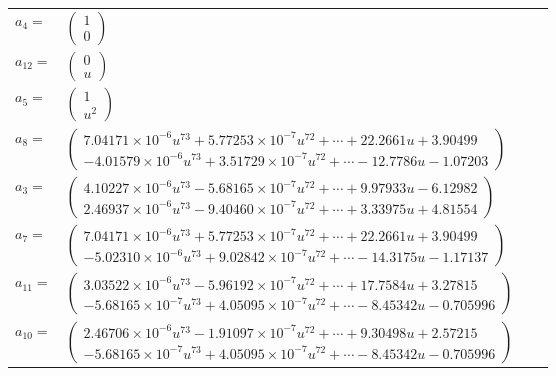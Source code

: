 \documentclass[1p]{elsarticle_modified}
\theoremstyle{definition}
\begin{document}
\begin{tabular}{m{7pt} m{180pt} m{7pt} m{180pt} }
\flushright $a_{4}=$&$\begin{pmatrix}1\\0\end{pmatrix}$ \\
\flushright $a_{12}=$&$\begin{pmatrix}0\\u\end{pmatrix}$ \\
\flushright $a_{5}=$&$\begin{pmatrix}1\\u^2\end{pmatrix}$ \\
\flushright $a_{8}=$&$\begin{pmatrix}7.04171\times10^{-6} u^{73}+5.77253\times10^{-7} u^{72}+\cdots+22.2661 u+3.90499\\-4.01579\times10^{-6} u^{73}+3.51729\times10^{-7} u^{72}+\cdots-12.7786 u-1.07203\end{pmatrix}$ \\
\flushright $a_{3}=$&$\begin{pmatrix}4.10227\times10^{-6} u^{73}-5.68165\times10^{-7} u^{72}+\cdots+9.97933 u-6.12982\\2.46937\times10^{-6} u^{73}-9.40460\times10^{-7} u^{72}+\cdots+3.33975 u+4.81554\end{pmatrix}$ \\
\flushright $a_{7}=$&$\begin{pmatrix}7.04171\times10^{-6} u^{73}+5.77253\times10^{-7} u^{72}+\cdots+22.2661 u+3.90499\\-5.02310\times10^{-6} u^{73}+9.02842\times10^{-7} u^{72}+\cdots-14.3175 u-1.17137\end{pmatrix}$ \\
\flushright $a_{11}=$&$\begin{pmatrix}3.03522\times10^{-6} u^{73}-5.96192\times10^{-7} u^{72}+\cdots+17.7584 u+3.27815\\-5.68165\times10^{-7} u^{73}+4.05095\times10^{-7} u^{72}+\cdots-8.45342 u-0.705996\end{pmatrix}$ \\
\flushright $a_{10}=$&$\begin{pmatrix}2.46706\times10^{-6} u^{73}-1.91097\times10^{-7} u^{72}+\cdots+9.30498 u+2.57215\\-5.68165\times10^{-7} u^{73}+4.05095\times10^{-7} u^{72}+\cdots-8.45342 u-0.705996\end{pmatrix}$ \\

\end{tabular}
\end{document}
